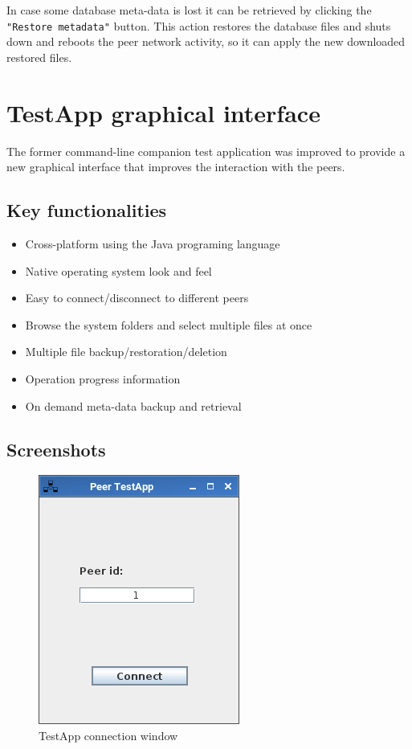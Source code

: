 \documentclass[a4paper,11pt]{article}
\begin{document}
In case some database meta-data is lost it can be retrieved by clicking the \texttt{"Restore metadata"} button. This action restores the database files and shuts down and reboots the peer network activity, so it can apply the new downloaded restored files.

\section{TestApp graphical interface}
The former command-line companion test application was improved to provide a new graphical interface that improves the interaction with the peers.

\subsection{Key functionalities}
\begin{itemize}
\item Cross-platform using the Java programing language
\item Native operating system look and feel
\item Easy to connect/disconnect to different peers
\item Browse the system folders and select multiple files at once
\item Multiple file backup/restoration/deletion
\item Operation progress information
\item On demand meta-data backup and retrieval
\end{itemize}

\subsection{Screenshots}
\begin{figure}[h]
    \centering
    \includegraphics[scale=0.40]{TestApp.png}
    \caption{TestApp connection window}
    \label{fig:TestApp.png}
\end{figure}
\end{document}
